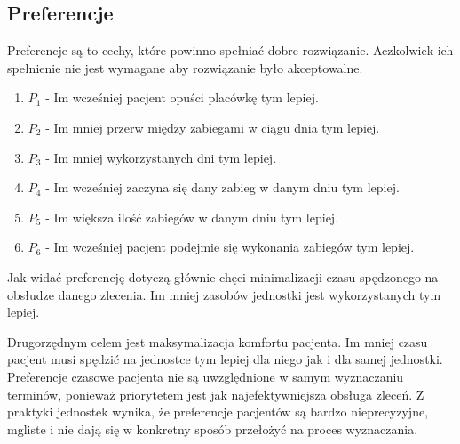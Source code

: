 \subsection{Preferencje}
\label{preferences}
Preferencje są to cechy, które powinno spełniać dobre rozwiązanie.
Aczkolwiek ich spełnienie nie jest wymagane aby rozwiązanie było akceptowalne.
\begin{enumerate}
	\item{$P_1$ - Im wcześniej pacjent opuści placówkę tym lepiej. }
	\item{$P_2$ - Im mniej przerw między zabiegami w ciągu dnia tym lepiej.}
	\item{$P_3$ - Im mniej wykorzystanych dni tym lepiej.}
	\item{$P_4$ - Im wcześniej zaczyna się dany zabieg w danym dniu tym lepiej.}
	\item{$P_5$ - Im większa ilość zabiegów w danym dniu tym lepiej.}
	\item{$P_6$ - Im wcześniej pacjent podejmie się wykonania zabiegów tym
		lepiej.}
\end{enumerate}

Jak widać preferencję dotyczą głównie chęci minimalizacji czasu spędzonego na
obsłudze danego zlecenia. Im mniej zasobów jednostki jest wykorzystanych tym
lepiej.

Drugorzędnym celem jest maksymalizacja komfortu pacjenta. Im mniej czasu pacjent
musi spędzić na jednostce tym lepiej dla niego jak i dla samej jednostki.
Preferencje czasowe pacjenta nie są uwzględnione w samym wyznaczaniu terminów,
ponieważ priorytetem jest jak najefektywniejsza obsługa zleceń. Z praktyki
jednostek wynika, że preferencje pacjentów są bardzo nieprecyzyjne, mgliste i
nie dają się w konkretny sposób przełożyć na proces wyznaczania.
